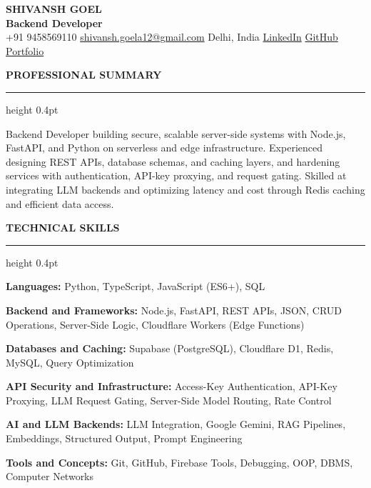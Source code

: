\documentclass[10pt,a4paper]{article}
\newcommand{\resumeSection}[1]{%
  \vspace{5pt}
  {\normalsize\bfseries\color{heading} #1}\par
  \vspace{1pt}
  {\color{rulecolor}\hrule height 0.4pt}
  \vspace{3pt}
}
\newcommand{\skillLine}[2]{%
  \textbf{#1:} #2\par
}
\begin{document}
\begin{center}
    {\fontsize{21}{23}\selectfont\bfseries\color{heading}
    SHIVANSH GOEL}\\[2pt]
    {\normalsize\bfseries Backend Developer}\\[4pt]

    {\small
    +91 9458569110
    \quad \textbar{} \quad
    \href{mailto:shivansh.goela12@gmail.com}
    {shivansh.goela12@gmail.com}
    \quad \textbar{} \quad
    Delhi, India
    \quad \textbar{} \quad
    \href{https://www.linkedin.com/in/shivansh-goel-5b2309174}
    {LinkedIn}
    \quad \textbar{} \quad
    \href{https://github.com/Tech-aficionado}
    {GitHub}
    \quad \textbar{} \quad
    \href{https://ash-labs.tech}
    {Portfolio}
    }
\end{center}

\vspace{-4pt}

\resumeSection{PROFESSIONAL SUMMARY}

Backend Developer building secure, scalable server-side systems with Node.js,
FastAPI, and Python on serverless and edge infrastructure. Experienced
designing REST APIs, database schemas, and caching layers, and hardening
services with authentication, API-key proxying, and request gating.
Skilled at integrating LLM backends and optimizing latency and cost through
Redis caching and efficient data access.

\resumeSection{TECHNICAL SKILLS}

\small

\skillLine{Languages}
{Python, TypeScript, JavaScript (ES6+), SQL}

\skillLine{Backend and Frameworks}
{Node.js, FastAPI, REST APIs, JSON, CRUD Operations, Server-Side Logic,
Cloudflare Workers (Edge Functions)}

\skillLine{Databases and Caching}
{Supabase (PostgreSQL), Cloudflare D1, Redis, MySQL, Query Optimization}

\skillLine{API Security and Infrastructure}
{Access-Key Authentication, API-Key Proxying, LLM Request Gating,
Server-Side Model Routing, Rate Control}

\skillLine{AI and LLM Backends}
{LLM Integration, Google Gemini, RAG Pipelines, Embeddings,
Structured Output, Prompt Engineering}

\skillLine{Tools and Concepts}
{Git, GitHub, Firebase Tools, Debugging, OOP, DBMS, Computer Networks}
\end{document}
